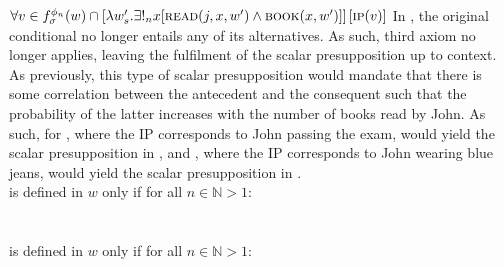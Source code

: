 $\forall v\in f^{\phi_n}_\sigma(w)\cap [\lambda w'_s.\exists!_n{x}[\text{\scshape{read}}(j,x,w')\land\text{\scshape{book}}(x,w')]]\hspace{0.5mm}[\text{\scshape{ip}}(v)]$
\xe
In , the original conditional no longer entails any of its alternatives. As such,  third axiom no longer applies, leaving the fulfilment of the scalar presupposition up to context. As previously, this type of scalar presupposition would mandate that there is some correlation between the antecedent and the consequent such that the probability of the latter increases with the number of books read by John. As such, for , where the IP corresponds to John passing the exam, would yield the scalar presupposition in , and , where the IP corresponds to John wearing blue jeans, would yield the scalar presupposition in .
\ex
{}\\ is defined in $w$ only if for all $n\in\mathbb{N}>1$:\\
\\
\xe
\ex
{}\\ is defined in $w$ only if for all $n\in\mathbb{N}>1$:\\
\\
